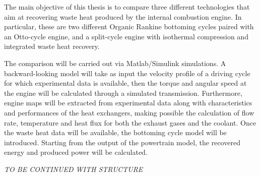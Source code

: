 The main objective of this thesis is to compare three different technologies that aim at recovering waste heat produced by the internal combustion engine. In particular, these are two different Organic Rankine bottoming cycles paired with an Otto-cycle engine, and a split-cycle engine with isothermal compression and integrated waste heat recovery.

The comparison will be carried out via Matlab/Simulink simulations. A backward-looking model will take as input the velocity profile of a driving cycle for which experimental data is available, then the torque and angular speed at the engine will be calculated through a simulated transmission. Furthermore, engine maps will be extracted from experimental data along with characteristics and performances of the heat exchangers, making possible the calculation of flow rate, temperature and heat flux for both the exhaust gases and the coolant. Once the waste heat data will be available, the bottoming cycle model will be introduced. Starting from the output of the powertrain model, the recovered energy and produced power will be calculated.

\emph{TO BE CONTINUED WITH STRUCTURE}


